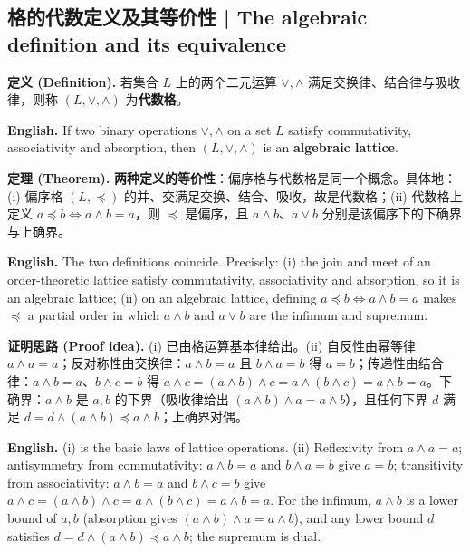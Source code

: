\documentclass[UTF8,11pt,a4paper]{ctexart}
\newcommand{\EN}[1]{\par\noindent \textbf{English.} #1\par}
\newcommand{\DEF}[2]{\par\noindent\textbf{定义 (Definition).} #1\par\EN{#2}}
\newcommand{\THM}[2]{\par\noindent\textbf{定理 (Theorem).} #1\par\EN{#2}}
\newcommand{\PRF}[2]{\par\noindent\textbf{证明思路 (Proof idea).} #1\par\EN{#2}}
\begin{document}
\subsection{格的代数定义及其等价性 | The algebraic definition and its equivalence}
\DEF{若集合 $L$ 上的两个二元运算 $\vee,\wedge$ 满足交换律、结合律与吸收律，则称 $(L,\vee,\wedge)$ 为\textbf{代数格}。}{If two binary operations $\vee,\wedge$ on a set $L$ satisfy commutativity, associativity and absorption, then $(L,\vee,\wedge)$ is an \textbf{algebraic lattice}.}
\THM{\textbf{两种定义的等价性}：偏序格与代数格是同一个概念。具体地：(i) 偏序格 $(L,\preccurlyeq)$ 的并、交满足交换、结合、吸收，故是代数格；(ii) 代数格上定义 $a\preccurlyeq b\Leftrightarrow a\wedge b=a$，则 $\preccurlyeq$ 是偏序，且 $a\wedge b$、$a\vee b$ 分别是该偏序下的下确界与上确界。}{The two definitions coincide. Precisely: (i) the join and meet of an order-theoretic lattice satisfy commutativity, associativity and absorption, so it is an algebraic lattice; (ii) on an algebraic lattice, defining $a\preccurlyeq b\Leftrightarrow a\wedge b=a$ makes $\preccurlyeq$ a partial order in which $a\wedge b$ and $a\vee b$ are the infimum and supremum.}
\PRF{(i) 已由格运算基本律给出。(ii) 自反性由幂等律 $a\wedge a=a$；反对称性由交换律：$a\wedge b=a$ 且 $b\wedge a=b$ 得 $a=b$；传递性由结合律：$a\wedge b=a$、$b\wedge c=b$ 得 $a\wedge c=(a\wedge b)\wedge c=a\wedge(b\wedge c)=a\wedge b=a$。下确界：$a\wedge b$ 是 $a,b$ 的下界（吸收律给出 $(a\wedge b)\wedge a=a\wedge b$），且任何下界 $d$ 满足 $d=d\wedge(a\wedge b)\preccurlyeq a\wedge b$；上确界对偶。}{(i) is the basic laws of lattice operations. (ii) Reflexivity from $a\wedge a=a$; antisymmetry from commutativity: $a\wedge b=a$ and $b\wedge a=b$ give $a=b$; transitivity from associativity: $a\wedge b=a$ and $b\wedge c=b$ give $a\wedge c=(a\wedge b)\wedge c=a\wedge(b\wedge c)=a\wedge b=a$. For the infimum, $a\wedge b$ is a lower bound of $a,b$ (absorption gives $(a\wedge b)\wedge a=a\wedge b$), and any lower bound $d$ satisfies $d=d\wedge(a\wedge b)\preccurlyeq a\wedge b$; the supremum is dual.}
\end{document}

